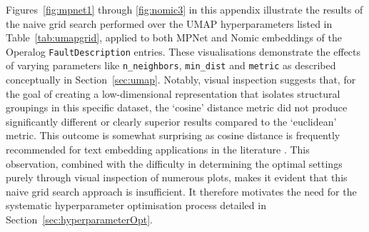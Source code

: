 \documentclass[10pt,oneside]{report}
\begin{document}
Figures~\ref{fig:mpnet1} through \ref{fig:nomic3} in this appendix illustrate the results of the naive grid search performed over the UMAP hyperparameters listed in Table~\ref{tab:umapgrid}, applied to both MPNet and Nomic embeddings of the Operalog \texttt{FaultDescription} entries. These visualisations demonstrate the effects of varying parameters like \texttt{n\_neighbors}, \texttt{min\_dist} and \texttt{metric} as described conceptually in Section~\ref{sec:umap}. Notably, visual inspection suggests that, for the goal of creating a low-dimensional representation that isolates structural groupings in this specific dataset, the `cosine' distance metric did not produce significantly different or clearly superior results compared to the `euclidean' metric. This outcome is somewhat surprising as cosine distance is frequently recommended for text embedding applications in the literature \cite{cao2024recent, baba2017plagiarism}. This observation, combined with the difficulty in determining the optimal settings purely through visual inspection of numerous plots, makes it evident that this naive grid search approach is insufficient. It therefore motivates the need for the systematic hyperparameter optimisation process detailed in Section~\ref{sec:hyperparameterOpt}.
\end{document}
